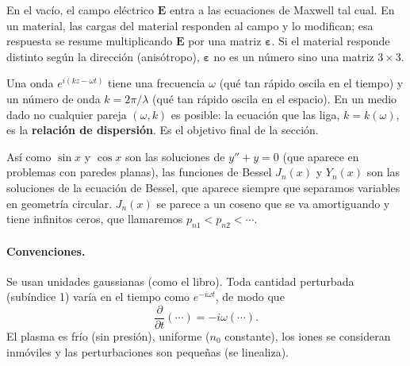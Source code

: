 \documentclass[11pt,a4paper]{article}
\newcommand{\E}{\mathbf{E}}
\newcommand{\eps}{\boldsymbol{\varepsilon}}
\begin{document}
\begin{idea}[¿Qué es el tensor dieléctrico $\eps$?]
En el vacío, el campo eléctrico $\E$ entra a las ecuaciones de Maxwell tal cual. En un material, las cargas del material responden al campo y lo modifican; esa respuesta se resume multiplicando $\E$ por una matriz $\eps$. Si el material responde distinto según la dirección (anisótropo), $\eps$ no es un número sino una matriz $3\times 3$.
\end{idea}

\begin{idea}
Una onda $e^{i(kz-\omega t)}$ tiene una frecuencia $\omega$ (qué tan rápido oscila en el tiempo) y un número de onda $k=2\pi/\lambda$ (qué tan rápido oscila en el espacio). En un medio dado no cualquier pareja $(\omega,k)$ es posible: la ecuación que las liga, $k=k(\omega)$, es la \textbf{relación de dispersión}. Es el objetivo final de la sección.
\end{idea}

\begin{idea}
Así como $\sin x$ y $\cos x$ son las soluciones de $y''+y=0$ (que aparece en problemas con paredes planas), las funciones de Bessel $J_n(x)$ y $Y_n(x)$ son las soluciones de la ecuación de Bessel, que aparece siempre que separamos variables en geometría circular. $J_n(x)$ se parece a un coseno que se va amortiguando y tiene infinitos ceros, que llamaremos $p_{n1}<p_{n2}<\cdots$.
\end{idea}

\paragraph{Convenciones.} Se usan unidades gaussianas (como el libro). Toda cantidad perturbada (subíndice 1) varía en el tiempo como $e^{-i\omega t}$, de modo que
\begin{equation}
\frac{\partial}{\partial t}\left(\cdots\right) = -i\omega\left(\cdots\right).
\label{eq:dt}
\end{equation}
El plasma es frío (sin presión), uniforme ($n_0$ constante), los iones se consideran inmóviles y las perturbaciones son pequeñas (se linealiza).
\end{document}
